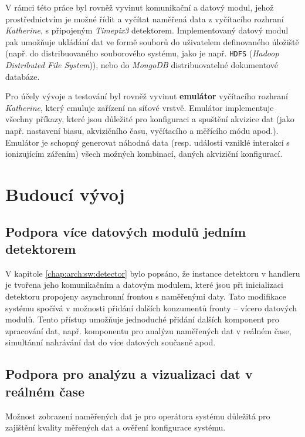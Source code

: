 V rámci této práce byl rovněž vyvinut komunikační a datový modul, jehož prostřednictvím je možné řídit a vyčítat naměřená data z vyčítacího rozhraní \textit{Katherine}, s připojeným \textit{Timepix3} detektorem. Implementovaný datový modul pak umožňuje ukládání dat ve formě souborů do uživatelem definovaného úložiště (např. do distribuovaného souborového systému, jako je např. \texttt{HDFS} (\textit{Hadoop Distributed File System})), nebo do \textit{MongoDB} distribuovatelné dokumentové databáze.

Pro účely vývoje a testování byl rovněž vyvinut \textbf{emulátor} vyčítacího rozhraní \textit{Katherine}, který emuluje zařízení na síťové vrstvě. Emulátor implementuje všechny příkazy, které jsou důležité pro konfiguraci a spuštění akvizice dat (jako např. nastavení biasu, akvizičního času, vyčítacího a měřícího módu apod.). Emulátor je schopný generovat náhodná data (resp. události vzniklé interakcí s ionizujícím zářením) všech možných kombinací, daných akviziční konfigurací.

\section{Budoucí vývoj}
\subsection{Podpora více datových modulů jedním detektorem}
V kapitole \ref{chap:arch:sw:detector} bylo popsáno, že instance detektoru v handleru je tvořena jeho komunikačním a datovým modulem, které jsou při inicializaci detektoru propojeny asynchronní frontou s naměřenými daty. Tato modifikace systému spočívá v možnosti přidání dalších konzumentů fronty -- vícero datových modulů. Tento přístup umožňuje jednoduché přidání dalších komponent pro zpracování dat, např. komponentu pro analýzu naměřených dat v reálném čase, simultánní nahrávání dat do více datových současně apod.

\subsection{Podpora pro analýzu a vizualizaci dat v reálném čase}
Možnost zobrazení naměřených dat je pro operátora systému důležitá pro zajištění kvality měřených dat a ověření konfigurace systému. 

